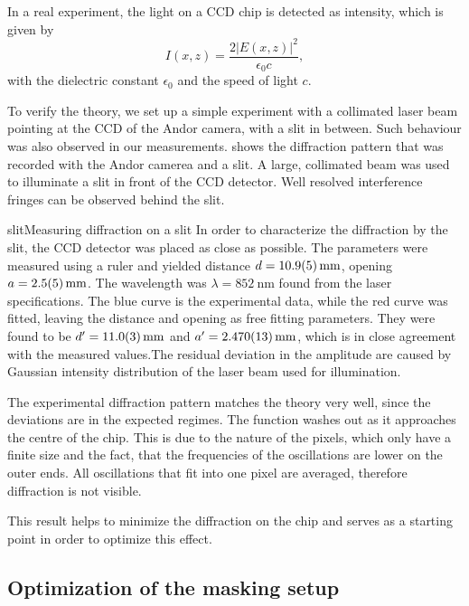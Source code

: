 In a real experiment, the light on a CCD chip is detected as intensity, which is given by
\begin{equation}
I(x,z) = \frac{2 \lvert E(x,z) \rvert ^2}{\epsilon_0 c} ,
\end{equation}
with the dielectric constant $\epsilon_0$ and the speed of light $c$.

To verify the theory, we set up a simple experiment with a collimated laser beam pointing at the CCD of the Andor camera, with a slit in between. Such behaviour was also observed in our measurements.  shows the diffraction pattern that was recorded with the Andor camerea and a slit. A large, collimated beam was used to illuminate a slit in front of the CCD detector. Well resolved interference fringes can be observed behind the slit.

\pltCustom{
	\begin{center}
		
		
	\end{center}
}
{slit}{Measuring diffraction on a slit}{
	In order to characterize the diffraction by the slit, the CCD detector was placed as close as possible. The parameters were measured using a ruler and yielded distance $d=\SI{10.9\pm0.5}{\milli\meter}$, opening $a=\SI{2.5\pm0.5}{\milli\meter}$. The wavelength was $\lambda =\SI{852}{\nano\meter}$ found from the laser specifications. The blue curve is the experimental data, while the red curve was fitted, leaving the distance and opening as free fitting parameters. They were found to be $d^\prime=\SI{11.0\pm0.3}{\milli\meter}$ and $a^\prime=\SI{2.470\pm0.013}{\milli\meter}$, which is in close agreement with the measured values.The residual deviation in the amplitude are caused by Gaussian intensity distribution of the laser beam used for illumination.
}

The experimental diffraction pattern matches the theory very well, since the deviations are in the expected regimes.
The function washes out as it approaches the centre of the chip. This is due to the nature of the pixels, which only have a finite size and the fact, that the frequencies of the oscillations are lower on the outer ends. All oscillations that fit into one pixel are averaged, therefore diffraction is not visible.

This result helps to minimize the diffraction on the chip and serves as a starting point in order to optimize this effect.

\subsection{Optimization of the masking setup}
\label{subsec:slit_optim}

